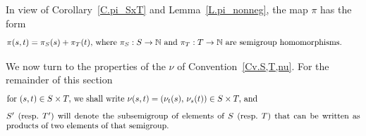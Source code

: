 \documentclass{amsart}
\numberwithin{equation}{section}
\numberwithin{theorem}{section}
\newcommand{\N}{\mathbb{N}}
\begin{document}
In view of Corollary~\ref{C.pi_SxT} and Lemma~\ref{L.pi_nonneg},
the map $\pi$ has the form
%
\begin{equation}\begin{minipage}[c]{35pc}\label{d.pi+pi}
$\pi(s,t)=\pi_S(s)+\pi_T(t),$ where
$\pi_S:S\to\N$ and $\pi_T:T\to\N$ are semigroup homomorphisms.
\end{minipage}\end{equation}
\vspace{-.5em}

We now turn to the properties of the $\nu$
of Convention~\ref{Cv.S,T,nu}.
For the remainder of this section
%
\begin{equation}\begin{minipage}[c]{35pc}\label{d.nu(s,t)}
for $(s,t)\in S\times T,$ we shall write
$\nu(s,t) = (\nu_t(s),\,\nu_s(t))\in S\times T,$ and
\end{minipage}\end{equation}
%
\begin{equation}\begin{minipage}[c]{35pc}\label{d.S'T'}
$S'$ \textup{(}resp.~$T')$ will denote the subsemigroup of
elements of $S$ \textup{(}resp.~$T)$ that can be written as products of
two elements of that semigroup.
\end{minipage}\end{equation}
\vspace{-.5em}
\end{document}
